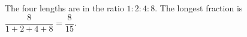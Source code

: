 The four lengths are in the ratio $1:2:4:8$. The longest fraction is $\boxed{\dfrac{8}{1+2+4+8}=\dfrac{8}{15}}$.
